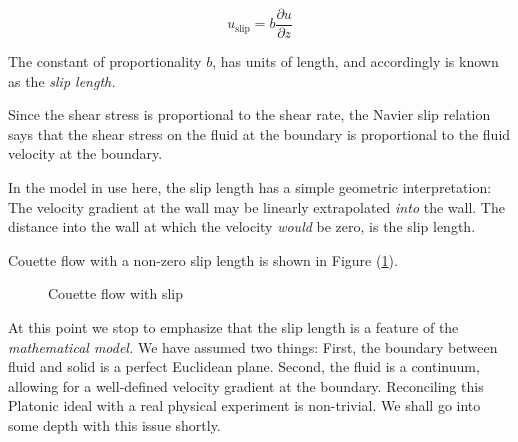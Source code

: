 \documentclass[12pt, a4paper, twoside, openright]{book}
\begin{document}
\begin{equation}
u_{\mathrm{slip}} = b \frac{\partial u}{\partial z}
\end{equation}

The constant of proportionality $b$, has units of length, and accordingly is known as the \emph{slip length.}

Since the shear stress is proportional to the shear rate, the Navier slip relation says that the shear stress on the fluid at the boundary is proportional to the fluid velocity at the boundary.

In the model in use here, the slip length has a simple geometric interpretation: 
The velocity gradient at the wall may be linearly extrapolated \emph{into} the wall. The distance into the wall at which the velocity \emph{would} be zero, is the slip length.

Couette flow with a non-zero slip length is shown in Figure (\ref{Couetteslip}).

\begin{figure}[ht]
\centering
{}
\caption{Couette flow with slip} \label{Couetteslip}
\end{figure}

At this point we stop to emphasize that the slip length is a feature of the \emph{mathematical model.} We have assumed two things: First, the boundary between fluid and solid is a perfect Euclidean plane. Second, the fluid is a continuum, allowing for a well-defined velocity gradient at the boundary. Reconciling this Platonic ideal with a real physical experiment is non-trivial. We shall go into some depth with this issue shortly.
\end{document}
